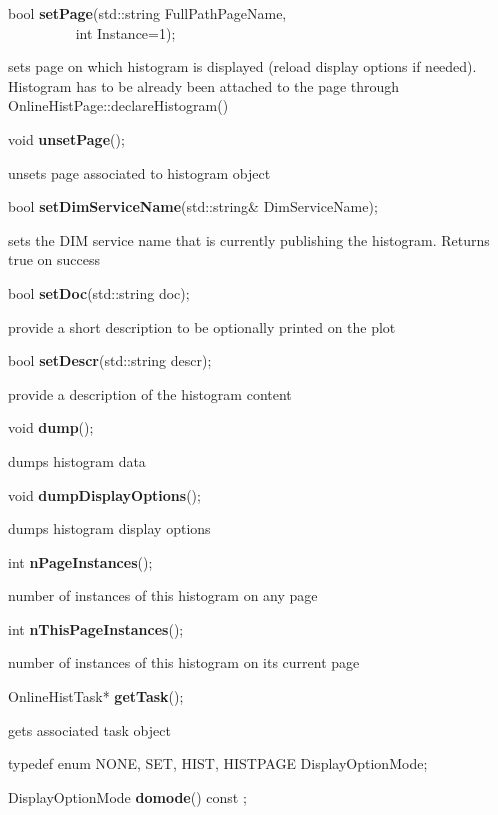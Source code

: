 \item    bool {\bf setPage}(std::string FullPathPageName,\\\mbox{}~~~~~~~~~
	       int Instance=1);

 sets page on which histogram is displayed (reload display options if needed). Histogram has to be already
 been attached to the page through OnlineHistPage::declareHistogram()


\item    void {\bf unsetPage}();


 unsets page associated to histogram object


\item    bool {\bf setDimServiceName}(std::string\& DimServiceName);


 sets the DIM service name that is currently publishing the histogram. Returns true on success


\item    bool {\bf setDoc}(std::string doc);


 provide a short description to be optionally printed on the plot 


\item    bool {\bf setDescr}(std::string descr);


 provide a  description of the histogram content 


\item    void {\bf dump}();


 dumps histogram data


\item    void {\bf dumpDisplayOptions}();


 dumps histogram display options


\item    int {\bf nPageInstances}();


 number of instances of this histogram on any page


\item    int {\bf nThisPageInstances}();


 number of instances of this histogram on its current page


\item    OnlineHistTask* {\bf getTask}();


 gets associated task object


\item   typedef enum { NONE, SET, HIST, HISTPAGE } DisplayOptionMode;
\item    DisplayOptionMode {\bf domode}() const ;

